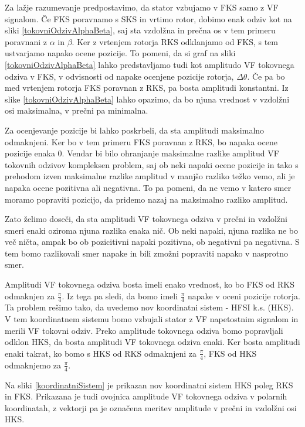 \documentclass[a4paper,twoside,openright,12pt,slovene]{book}
\begin{document}
Za lažje razumevanje predpostavimo, da stator vzbujamo v FKS samo z VF signalom. Če FKS poravnamo s SKS in vrtimo rotor, dobimo enak odziv kot na sliki \ref{tokovniOdzivAlphaBeta}, saj sta vzdolžna in
prečna os v tem primeru poravnani z $\alpha$ in $\beta$. Ker z vrtenjem rotorja RKS odklanjamo od FKS, s tem ustvarjamo napako ocene pozicije. To pomeni, da si graf na sliki
\ref{tokovniOdzivAlphaBeta} lahko predstavljamo tudi kot amplitudo VF tokovnega odziva v FKS, v odvisnosti od napake ocenjene pozicije rotorja, $\Delta\theta$. Če pa bo med vrtenjem rotorja FKS
poravnan z RKS, pa bosta amplitudi konstantni. Iz slike \ref{tokovniOdzivAlphaBeta} lahko opazimo, da bo njuna vrednost v vzdolžni osi maksimalna, v prečni pa minimalna. 

Za ocenjevanje pozicije bi lahko poskrbeli, da sta amplitudi maksimalno odmaknjeni. Ker bo v tem primeru FKS poravnan z RKS, bo napaka ocene pozicije enaka 0. Vendar bi bilo ohranjanje maksimalne
razlike amplitud VF tokovnih odzivov kompleksen problem, saj ob neki napaki ocene pozicije in tako s prehodom izven maksimalne razlike amplitud v manjšo razliko težko vemo, ali je napaka ocene
pozitivna ali negativna. To pa pomeni, da ne vemo v katero smer moramo popraviti pozicijo, da pridemo nazaj na maksimalno razliko amplitud.

Zato želimo doseči, da sta amplitudi VF tokovnega odziva v prečni in vzdolžni smeri enaki oziroma njuna razlika enaka nič. Ob neki napaki, njuna razlika ne bo več ničta, ampak bo ob pozicitivni napaki pozitivna, ob negativni pa
negativna. S tem bomo razlikovali smer napake in bili zmožni popraviti napako v nasprotno smer. 

Amplitudi VF tokovnega odziva bosta imeli enako vrednost, ko bo FKS od RKS odmaknjen za $\frac{\pi}{4}$. Iz tega pa sledi, da bomo imeli $\frac{\pi}{4}$ napake v oceni pozicije rotorja. Ta problem
rešimo tako, da uvedemo nov koordinatni sistem - HFSI k.s. (HKS). V tem koordinatnem sistemu bomo vzbujali stator z VF napetostnim signalom in merili VF tokovni odziv. Preko amplitude tokovnega odziva
bomo popravljali odklon HKS, da bosta amplitudi VF tokovnega odziva enaki. Ker bosta amplitudi enaki takrat, ko bomo s HKS od RKS odmaknjeni za $\frac{\pi}{4}$, FKS od HKS odmaknjemo za
$\frac{\pi}{4}$. 

Na sliki \ref{koordinatniSistem} je prikazan nov koordinatni sistem HKS poleg RKS in FKS. Prikazana je tudi ovojnica amplitude VF tokovnega odziva v polarnih koordinatah, z vektorji pa je označena
meritev amplitude v prečni in vzdolžni osi HKS. 
\end{document}
